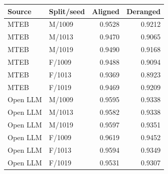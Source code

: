 \begin{tabular}{llrr}\toprule Source & Split/seed & Aligned & Deranged \\ \midrule
MTEB & M/1009 & 0.9528 & 0.9212 \\
MTEB & M/1013 & 0.9470 & 0.9065 \\
MTEB & M/1019 & 0.9490 & 0.9168 \\
MTEB & F/1009 & 0.9488 & 0.9094 \\
MTEB & F/1013 & 0.9369 & 0.8923 \\
MTEB & F/1019 & 0.9469 & 0.9209 \\
Open LLM & M/1009 & 0.9595 & 0.9338 \\
Open LLM & M/1013 & 0.9582 & 0.9338 \\
Open LLM & M/1019 & 0.9597 & 0.9351 \\
Open LLM & F/1009 & 0.9619 & 0.9452 \\
Open LLM & F/1013 & 0.9594 & 0.9349 \\
Open LLM & F/1019 & 0.9531 & 0.9307 \\
\bottomrule\end{tabular}
